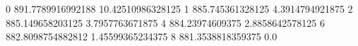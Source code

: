 0 891.7789916992188 10.42510986328125
1 885.745361328125 4.3914794921875
2 885.149658203125 3.7957763671875
4 884.23974609375 2.8858642578125
6 882.8098754882812 1.45599365234375
8 881.3538818359375 0.0
